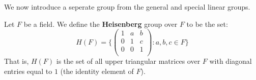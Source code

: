 We now introduce a seperate group from the general and special linear groups.

\begin{definition}
    Let $F$ be a field. We define the \textbf{Heisenberg} group over $F$ to be
    the set:
    \begin{equation}
        H(F)=\{
            \begin{pmatrix}
                1   &   a   &   b   \\
                0   &   1   &   c   \\
                0   &   0   &   1   \\
            \end{pmatrix} :
            a,b,c \in F
        \}
    \end{equation}
    That is, $H(F)$ is the set of all upper triangular matrices over $F$ with
    diagonal entries equal to $1$  (the identity element of $F$).
\end{definition}


